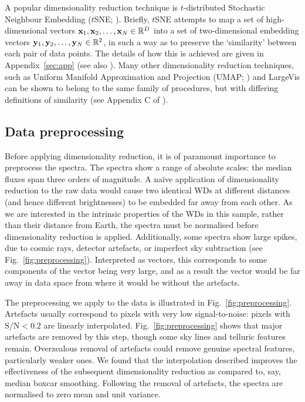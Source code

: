 \documentclass[fleqn,usenatbib]{mnras}
\def\xb{\vb{x}}
\def\yb{\vb{y}}
\begin{document}
A popular dimensionality reduction technique is $t$-distributed Stochastic Neighbour Embedding ($t$SNE; \citealt{tsne}).
Briefly, $t$SNE attempts to map a set of high-dimensional vectors $\xb_1, \xb_2, \dots, \xb_N \in \mathbb{R}^D$ into a set of two-dimensional embedding vectors $\yb_1, \yb_2, \dots, \yb_N \in \mathbb{R}^2$, in such a way as to preserve the `similarity' between each pair of data points.
The details of how this is achieved are given in Appendix~\ref{sec:app} (see also \citealt{tsne}).
Many other dimensionality reduction techniques, such as Uniform Manifold Approximation and Projection (UMAP; \citealt{umap}) and LargeVis \citep{largevis} can be shown to belong to the same family of procedures, but with differing definitions of similarity (see Appendix C of \citealt{umap}).


\subsection{Data preprocessing}
\label{sec:preprocessing}

Before applying dimensionality reduction, it is of paramount importance to preprocess the spectra.
The spectra show a range of absolute scales: the median fluxes span three orders of magnitude.
A na\"{i}ve application of dimensionality reduction to the raw data would cause two identical WDs at different distances (and hence different brightnesses) to be embedded far away from each other.
As we are interested in the intrinsic properties of the WDs in this sample, rather than their distance from Earth, the spectra must be normalised before dimensionality reduction is applied.
Additionally, some spectra show large spikes, due to cosmic rays, detector artefacts, or imperfect sky subtraction (see Fig.~\ref{fig:preprocessing}).
Interpreted as vectors, this corresponds to some components of the vector being very large, and as a result the vector would be far away in data space from where it would be without the artefacts.

The preprocessing we apply to the data is illustrated in Fig.~\ref{fig:preprocessing}.
Artefacts usually correspond to pixels with very low signal-to-noise: pixels with $\mathrm{S}/\mathrm{N}<0.2$ are linearly interpolated.
Fig.~\ref{fig:preprocessing} shows that major artefacts are removed by this step, though some sky lines and telluric features remain.
Overzealous removal of artefacts could remove genuine spectral features, particularly weaker ones.
We found that the interpolation described improves the effectiveness of the subsequent dimensionality reduction as compared to, say, median boxcar smoothing.
Following the removal of artefacts, the spectra are normalised to zero mean and unit variance.
\end{document}
